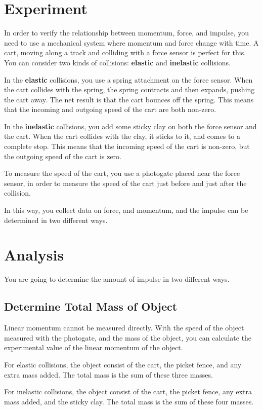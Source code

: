\section{Experiment}
%
In order to verify the relationship between momentum, force, and impulse, you need to use a mechanical system where momentum and force change with time. A cart, moving along a track and colliding with a force sensor is perfect for this. You can consider two kinds of collisions: \textbf{elastic} and \textbf{inelastic} collisions.

In the \textbf{elastic} collisions, you use a spring attachment on the force sensor. When the cart collides with the spring, the spring contracts and then expands, pushing the cart away. The net result is that the cart bounces off the spring. This means that the incoming and outgoing speed of the cart are both non-zero.

In the \textbf{inelastic} collisions, you add some sticky clay on both the force sensor and the cart. When the cart collides with the clay, it sticks to it, and comes to a complete stop. This means that the incoming speed of the cart is non-zero, but the outgoing speed of the cart is zero.

To measure the speed of the cart, you use a photogate placed near the force sensor, in order to measure the speed of the cart just before and just after the collision.

In this way, you collect data on force, and momentum, and the impulse can be determined in two different ways.
%
\section{Analysis}
%
You are going to determine the amount of impulse in two different ways.
%
\subsection{Determine Total Mass of Object}
%
Linear momentum cannot be measured directly. With the speed of the object measured with the photogate, and the mass of the object, you can calculate the experimental value of the linear momentum of the object.

For elastic collisions, the object consist of the cart, the picket fence, and any extra mass added. The total mass is the sum of these three masses.

For inelastic collisions, the object consist of the cart, the picket fence, any extra mass added, and the sticky clay. The total mass is the sum of these four masses.
%
